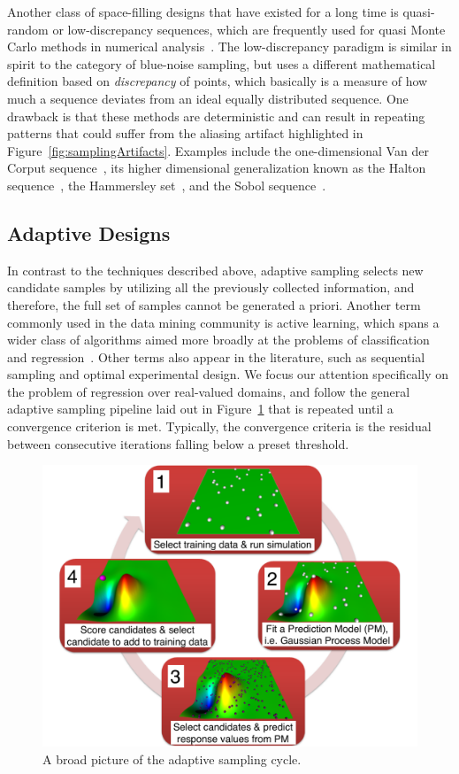 Another class of space-filling designs that have existed for a long time is quasi-random or low-discrepancy sequences, which are frequently used for quasi Monte Carlo methods in numerical analysis~\cite{Niederreiter1992}.
%
The low-discrepancy paradigm is similar in spirit to the category of blue-noise sampling, but uses a different mathematical definition based on \textit{discrepancy} of points, which basically is a measure of how much a sequence deviates from an ideal equally distributed sequence.
%
One drawback is that these methods are deterministic and can result in repeating patterns that could suffer from the aliasing artifact highlighted in Figure~\ref{fig:samplingArtifacts}.
%
Examples include the one-dimensional Van der Corput sequence~\cite{vanderCorput1935}, its higher dimensional generalization known as the Halton sequence~\cite{Halton1964,BraatenWeller1979}, the Hammersley set~\cite{HammersleyHandscomb1964}, and the Sobol sequence~\cite{Sobol1967}.

\subsection{Adaptive Designs}
\label{sec:adaptiveSampling}

In contrast to the techniques described above, adaptive sampling selects new candidate samples by utilizing all the previously collected information, and therefore, the full set of samples cannot be generated a priori.
%
Another term commonly used in the data mining community is active learning, which spans a wider class of algorithms aimed more broadly at the problems of classification and regression~\cite{Settles2009}.
%
Other terms also appear in the literature, such as sequential sampling and optimal experimental design.
%
We focus our attention specifically on the problem of regression over real-valued domains, and follow the general adaptive sampling pipeline laid out in Figure~\ref{fig:asCycle} that is repeated until a convergence criterion is met.
%
Typically, the convergence criteria is the residual between consecutive iterations falling below a preset threshold.

\begin{figure}[b]
  \centering
  \includegraphics[width=.75\textwidth]{figs/chap3/pipeline}
  \caption[Adaptive Sampling Cycle]{A broad picture of the adaptive sampling
  cycle.}
  \label{fig:asCycle}
\end{figure}

